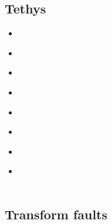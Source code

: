 \subsection{Tethys} 

\begin{scriptsize}
\begin{itemize}
\item[\nineteenninetynine] 
\textcite{vasb99} \\
\item[\twothousand] 
\textcite{mokd00} \\
\item[\twothousandeleven] 
\textcite{befa11} \\
\item[\twothousandthirteen]
\textcite{wagw13} \\
\item[\twothousandsixteen] 
\textcite{necg16} \\
\item[\twothousandeighteen] 
\textcite{marc18} \\
\item[\twothousandtwentyone] 
\textcite{gupg21b}  \\
\item[\twothousandtwentytwo] 
\textcite{gupg22}  \\
\textcite{lala22}  \\
\end{itemize}
\end{scriptsize}

\subsection{Transform faults} 

